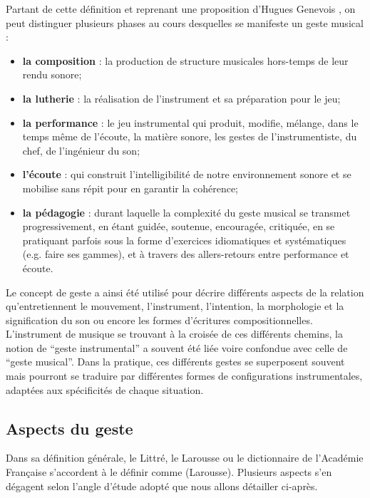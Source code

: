 \indent Partant de cette définition et reprenant une proposition d'Hugues Genevois \cite{genevois_geste_1999}, on peut distinguer plusieurs phases au cours desquelles se manifeste un geste musical :
\vspace{-1em}
\begin{itemize}[noitemsep]
\item \textbf{la composition} : la production de structure musicales hors-temps de leur rendu sonore;
\item \textbf{la lutherie} : la réalisation de l'instrument et sa préparation pour le jeu;
\item \textbf{la performance} : le jeu instrumental qui produit, modifie, mélange, dans le temps même de l'écoute, la matière sonore, les gestes de l'instrumentiste, du chef, de l'ingénieur du son;
\item \textbf{l'écoute} : qui construit l'intelligibilité de notre environnement sonore et se mobilise sans répit pour en garantir la cohérence;
\item \textbf{la pédagogie} : durant laquelle la complexité du geste musical se transmet progressivement, en étant guidée, soutenue, encouragée, critiquée, en se pratiquant parfois sous la forme d'exercices idiomatiques et systématiques (e.g. faire ses gammes), et à travers des allers-retours entre performance et écoute.
\end{itemize}
\noindent Le concept de geste a ainsi été utilisé pour décrire différents aspects de la relation qu'entretiennent le mouvement, l'instrument, l'intention, la morphologie et la signification du son ou encore les formes d'écritures compositionnelles. L'instrument de musique se trouvant à la croisée de ces différents chemins, la notion de ``geste instrumental'' a souvent été liée voire confondue avec celle de ``geste musical''. Dans la pratique, ces différents gestes se superposent souvent mais pourront se traduire par différentes formes de configurations instrumentales, adaptées aux spécificités de chaque situation.

\subsection{Aspects du geste}

\noindent Dans sa définition générale, le Littré, le Larousse ou le dictionnaire de l'Académie Française s'accordent à le définir comme  (Larousse). Plusieurs aspects s'en dégagent selon l'angle d'étude adopté que nous allons détailler ci-après.

